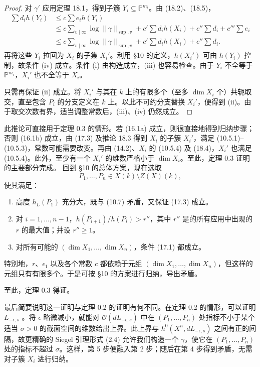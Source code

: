 \begin{proof}
对 $\gamma'$ 应用定理 18.1，得到子簇 $Y_i\subseteq\mathbb P^{m_i}$。由 (18.2)、(18.5)，
\begin{align*}
\sum d_i h(Y_i)&\le c\sum e_i h(Y_i)\\
&\le c\sum_{v\mid\infty}\log\|\gamma\|_{\sup,v}
+c'\sum d_i h(X_i)+c''\sum d_i+c'''\sum e_i\\
&\le c\sum_{v\mid\infty}\log\|\gamma\|_{\sup,v}
+c'\sum d_i h(X_i)+c''\sum d_i.
\end{align*}
再将这些 $Y_i$ 拉回为 $X_i$ 的子集 $X_i'$。利用 §10 的定义，$h(X_i')$ 可由 $h(Y_i)$ 控制，故条件 (iv) 成立。条件 (i) 由构造成立，(iii) 也容易检查。由于 $Y_i$ 不全等于 $\mathbb P^{m_i}$，$X_i'$ 也不全等于 $X_i$。

只需再保证 (ii) 成立。将 $X_i'$ 与其在 $k$ 上的有限多个（至多 $\dim X_i$ 个）共轭取交，直至包含 $P_i$ 的分支定义在 $k$ 上。以此不可约分支替换 $X_i'$，便得到 (ii)。由于取交次数有界，适当调整常数后，(iii)、(iv) 仍然成立。
\end{proof}
此推论可直接用于定理 0.3 的情形。若 (16.1a) 成立，则很直接地得到归纳步骤；否则 (16.1b) 成立，由 (17.3) 及推论 18.3 得到 $X_i$ 的子簇 $X_i'$，满足 (10.5.1)--(10.5.3)，常数可能需要改变。再由 (14.2)、$X_i$ 的 (10.5.4) 及 (18.4)，$X_i'$ 也满足 (10.5.4)。此外，至少有一个 $X_i'$ 的维数严格小于 $\dim X_i$。至此，定理 0.3 证明的主要部分完成。
回到 §10 的总体方案，现在选取
\[
P_1,\ldots,P_n\in X(k)\setminus Z(X)(k),
\]
使其满足：
\begin{enumerate}[label=(\alph*).]
\item 高度 $h_L(P_1)$ 充分大，既与 (10.7) 矛盾，又保证 (17.3) 成立。
\item 对 $i=1,\ldots,n-1$，$h(P_{i+1})/h(P_i)>r''$，其中 $r''$ 是的所有应用中出现的 $r$ 的最大值；并设 $r''\ge1$。
\item 对所有可能的 $(\dim X_1,\ldots,\dim X_n)$，条件 (17.1) 都成立。
\end{enumerate}
特别地，$r$、$\epsilon_1$ 以及各个常数 $c$ 都依赖于元组 $(\dim X_1,\ldots,\dim X_n)$，但这样的元组只有有限多个。于是可按 §10 的方案进行归纳，导出矛盾。

至此，定理 0.3 得证。

最后简要说明这一证明与定理 0.2 的证明有何不同。在定理 0.2 的情形，可以证明 $L_{-\epsilon,s}$ 。将 $\epsilon$ 略微减小，就能对 $\mathcal O(dL_{-\epsilon,s})$ 中在 $(P_1,\ldots,P_n)$ 处指标不小于某个适当 $\sigma>0$ 的截面空间的维数给出上界。此上界与 $h^0(X^n,dL_{-\epsilon,s})$ 之间有正的间隔，故更精确的 Siegel 引理形式 (2.4) 允许我们构造一个 $\gamma$，使它在 $(P_1,\ldots,P_n)$ 处的指标不超过 $\sigma$。这样，第 5 步便融入第 2 步；随后在第 4 步得到矛盾，无需对子簇 $X_i$ 进行归纳。

